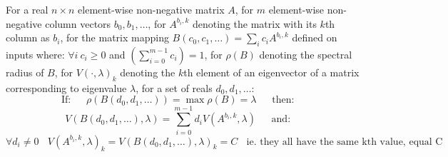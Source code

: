\begin{Theorem}\label{th:4}
For a real $n\times n$ element-wise non-negative matrix $A$, 
for $m$ element-wise non-negative column vectors $b_0,b_1,\dots$, 
for $A^{b_i,k}$ denoting the matrix with its $k$th column as $b_i$, 
for the matrix mapping $B(c_0,c_1,\dots) = \sum_{i}c_iA^{b_i,k}$ defined on inputs where: $\forall i~c_i\ge 0$ and $\left(\sum_{i=0}^{m-1}c_i\right)=1$, 
for $\rho(B)$ denoting the spectral radius of $B$, 
for $V(\cdot,\lambda)_k$ denoting the $k$th element of an eigenvector of a matrix corresponding to eigenvalue $\lambda$, 
for a set of reals $d_0,d_1,\dots$: 
$$\text{If:}~~~~~~~\rho(B(d_0,d_1,\dots)) = \max\rho(B)=\lambda ~~~~~~~\text{then:}~~~~~~~ $$ 
$$ V(B(d_0,d_1,\dots),\lambda) = \sum_{i=0}^{m-1}d_iV(A^{b_i,k},\lambda) ~~~~~~~\text{and:}~~~~~~~ $$
$$ \forall d_i\ne 0~~~~ V(A^{b_i,k},\lambda)_k=V(B(d_0,d_1,\dots),\lambda)_k=C  ~~~~\text{ie. they all have the same kth value, equal C}$$
\end{Theorem}
